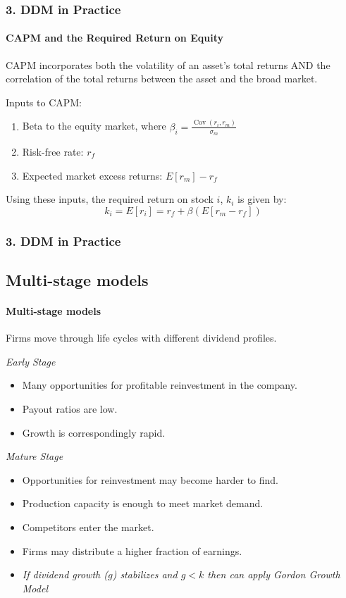 \documentclass{beamer}
\begin{document}
\begin{frame}[t]
    \frametitle{3. DDM in Practice}
    \framesubtitle{CAPM and the Required Return on Equity}

    CAPM incorporates both the volatility of an asset's total returns AND the correlation of the total returns between the asset and the broad market.\\
    \vspace{1em}

    Inputs to CAPM:
    \begin{enumerate}
        \item Beta to the equity market, where $\beta_i = \frac{\operatorname{Cov}(r_i,r_m)}{\sigma_m}$
        \item Risk-free rate: $r_f$
        \item Expected market excess returns: $E[r_m] - r_f$
    \end{enumerate}
    \vspace{1em}

    Using these inputs, the required return on stock $i$, $k_i$ is given by:
    $$
    k_i = E[r_i] = r_f + \beta(E[r_m - r_f])
    $$

\end{frame}



\begin{frame}[t]
    \frametitle{3. DDM in Practice}
    \subsection{Multi-stage models}
    \framesubtitle{Multi-stage models}

    Firms move through life cycles with different dividend profiles.\\
    \vspace{1em}

    \textit{Early Stage}
    \begin{itemize} 
        \item Many opportunities for profitable reinvestment in the company.
        \item Payout ratios are low.
        \item Growth is correspondingly rapid.
    \end{itemize}

    \textit{Mature Stage}
    \begin{itemize}
        \item Opportunities for reinvestment may become harder to find.
        \item Production capacity is enough to meet market demand.
        \item Competitors enter the market.
        \item Firms may distribute a higher fraction of earnings.
        \item \textit{If dividend growth ($g$) stabilizes and $g<k$ then can apply Gordon Growth Model}
    \end{itemize}

\end{frame}
\end{document}
